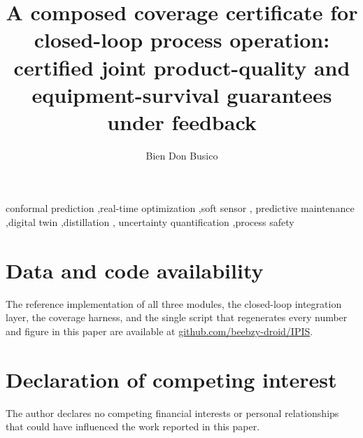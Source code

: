 \documentclass[review,12pt]{elsarticle}
\theoremstyle{definition}
\begin{document}
\begin{frontmatter}

\title{A composed coverage certificate for closed-loop process operation:
certified joint product-quality and equipment-survival guarantees under feedback}

\author{Bien Don Busico}
\address{Map\'ua Malayan Colleges Mindanao, Davao City, Philippines}

\begin{abstract}

\end{abstract}

\begin{keyword}
conformal prediction \sep real-time optimization \sep soft sensor \sep
predictive maintenance \sep digital twin \sep distillation \sep
uncertainty quantification \sep process safety
\end{keyword}

\end{frontmatter}
\linenumbers









\section*{Data and code availability}
The reference implementation of all three modules, the closed-loop integration
layer, the coverage harness, and the single script that regenerates every number
and figure in this paper are available at \url{github.com/beebzy-droid/IPIS}.

\section*{Declaration of competing interest}
The author declares no competing financial interests or personal relationships that
could have influenced the work reported in this paper.



\end{document}

